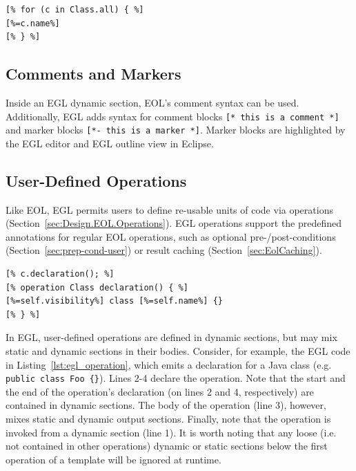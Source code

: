 \begin{lstlisting}[float=tbp, caption=Generating the name of each Class contained in an input model., label=lst:oo, language=EGL]
[% for (c in Class.all) { %]
[%=c.name%]
[% } %]
\end{lstlisting}

\subsection{Comments and Markers}
Inside an EGL dynamic section, EOL's comment syntax can be used. Additionally, EGL adds syntax for comment blocks \texttt{[* this is a comment *]} and marker blocks \texttt{[*- this is a marker *]}. Marker blocks are highlighted by the EGL editor and EGL outline view in Eclipse.

\subsection{User-Defined Operations}

Like EOL, EGL permits users to define re-usable units of code via operations (Section~\ref{sec:Design.EOL.Operations}). EGL operations support the predefined annotations for regular EOL operations, such as optional pre-/post-conditions (Section~\ref{sec:prep-cond-user}) or
result caching (Section~\ref{sec:EolCaching}).

\begin{lstlisting}[float=h, caption=Using an operation to specify the text generated for a declaration of a Java class., label=lst:egl_operation, language=EGL]
[% c.declaration(); %]
[% operation Class declaration() { %]
[%=self.visibility%] class [%=self.name%] {}
[% } %]
\end{lstlisting}

In EGL, user-defined operations are defined in dynamic sections, but may mix static and dynamic sections in their bodies. Consider, for example, the EGL code in Listing~\ref{lst:egl_operation}, which emits a declaration for a Java class (e.g. \texttt{public class Foo \{\}}). Lines 2-4 declare the operation. Note that the start and the end of the operation's declaration (on lines 2 and 4, respectively) are contained in dynamic sections. The body of the operation (line 3), however, mixes static and dynamic output sections. Finally, note that the operation is invoked from a dynamic section (line 1). It is worth noting that any loose (i.e. not contained in other operations) dynamic or static sections below the first operation of a template will be ignored at runtime.



